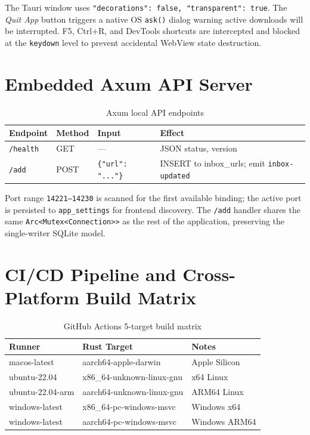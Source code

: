 \documentclass[10pt,letterpaper]{article}
\begin{document}
The Tauri window uses \texttt{"decorations": false, "transparent": true}. The \emph{Quit App}
button triggers a native OS \texttt{ask()} dialog warning active downloads will be
interrupted. F5, Ctrl+R, and DevTools shortcuts are intercepted and blocked at the
\texttt{keydown} level to prevent accidental WebView state destruction.

\section{Embedded Axum API Server}

\begin{table}[H]
\centering\small
\renewcommand{\arraystretch}{1.3}
\begin{tabular}{llll}
\toprule
Endpoint & Method & Input & Effect \\
\midrule
\texttt{/health} & GET & --- & JSON status, version \\
\texttt{/add} & POST & \texttt{\{"url": "..."\}} & INSERT to inbox\_urls; emit \texttt{inbox-updated} \\
\bottomrule
\end{tabular}
\caption{Axum local API endpoints}
\end{table}

Port range \texttt{14221--14230} is scanned for the first available binding; the active
port is persisted to \texttt{app\_settings} for frontend discovery. The \texttt{/add}
handler shares the same \texttt{Arc<Mutex<Connection>>} as the rest of the application,
preserving the single-writer SQLite model.

\section{CI/CD Pipeline and Cross-Platform Build Matrix}

\begin{table}[H]
\centering\small
\renewcommand{\arraystretch}{1.3}
\begin{tabular}{lll}
\toprule
Runner & Rust Target & Notes \\
\midrule
macos-latest & aarch64-apple-darwin & Apple Silicon \\
ubuntu-22.04 & x86\_64-unknown-linux-gnu & x64 Linux \\
ubuntu-22.04-arm & aarch64-unknown-linux-gnu & ARM64 Linux \\
windows-latest & x86\_64-pc-windows-msvc & Windows x64 \\
windows-latest & aarch64-pc-windows-msvc & Windows ARM64 \\
\bottomrule
\end{tabular}
\caption{GitHub Actions 5-target build matrix}
\end{table}
\end{document}
